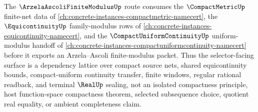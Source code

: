 The $\ArzelaAscoliFiniteModulusUp$ route consumes the $\CompactMetricUp$ finite-net data of \autoref{ch:concrete-instances-compactmetric-namecert}, the $\EquicontinuityUp$ family-modulus rows of \autoref{ch:concrete-instances-equicontinuity-namecert}, and the $\CompactUniformContinuityUp$ uniform-modulus handoff of \autoref{ch:concrete-instances-compactuniformcontinuity-namecert} before it exports an Arzela--Ascoli finite-modulus packet. Thus the selector-facing surface is a dependency lattice over compact source nets, shared equicontinuity bounds, compact-uniform continuity transfer, finite windows, regular rational readback, and terminal $\RealUp$ sealing, not an isolated compactness principle, host function-space compactness theorem, selected subsequence choice, quotient real equality, or ambient completeness claim.
